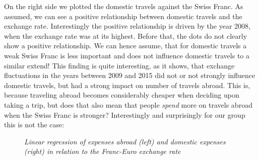 \documentclass[12pt,a4paper,bibliography=totocnumbered,listof=totocnumbered]{scrartcl}
\begin{document}
On the right side we plotted the domestic travels against the Swiss Franc. As assumed, we can see a positive relationship between domestic travels and the exchange rate. Interestingly the positive relationship is driven by the year 2008, when the exchange rate was at its highest. Before that, the dots do not clearly show a positive relationship. We can hence assume, that for domestic travels a weak Swiss Franc is less important and does not influence domestic travels to a similar extend! This finding is quite interesting, as it shows, that exchange fluctuations in the years between 2009 and 2015 did not or not strongly influence domestic travels, but had a strong impact on number of travels abroad. This is, because traveling abroad becomes considerably cheaper when deciding upon taking a trip, but does that also mean that people \textit{spend} more on travels abroad when the Swiss Franc is stronger? Interestingly and surprisingly for our group this is not the case:

\begin{figure}[htbp]
\centering
     \qquad
\caption{\textit{Linear regression of expenses abroad (left) and domestic expenses (right) in relation to the Franc-Euro exchange rate}}
\end{figure}
\end{document}
